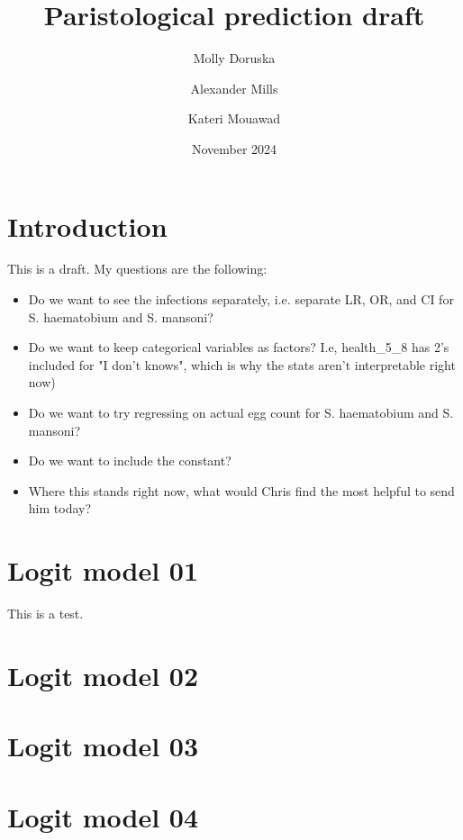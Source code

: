 \documentclass[12pt]{article}
\title{Paristological prediction draft}
\author{ Molly Doruska \and Alexander Mills \and Kateri Mouawad}
\date{\vspace{1ex}November 2024}
\begin{document}
\maketitle

\section{Introduction}
This is a draft. My questions are the following:
\begin{itemize}
    \item Do we want to see the infections separately, i.e. separate LR, OR, and CI for S. haematobium and S. mansoni?
    \item Do we want to keep categorical variables as factors? I.e, health\_5\_8 has 2's included for "I don't knows", which is why the stats aren't interpretable right now)
    \item Do we want to try regressing on actual egg count for S. haematobium and S. mansoni?
    \item Do we want to include the constant?
    \item Where this stands right now, what would Chris find the most helpful to send him today?
\end{itemize}
\tableofcontents 

\section{Logit model 01}




This is a test. 



\clearpage
\section{Logit model 02}








\clearpage
\section{Logit model 03}








\clearpage
\section{Logit model 04}







\end{document}
